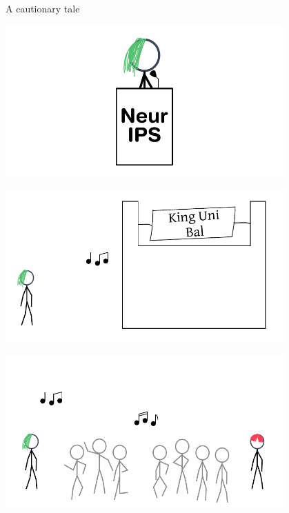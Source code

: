 \documentclass[aspectratio=169]{beamer}
\begin{document}
\begin{frame}{A cautionary tale}
     {
        \huge {}
    }
     {
        \huge {}
        \begin{center}
        \includegraphics[width=0.8\textwidth]{img/princess-comics-intro.pdf}
        \end{center}
    }
     {
        \huge {}
        \begin{center}
        \includegraphics[width=0.8\textwidth]{img/princess-comics-bal.pdf}
        \end{center}
    }
     {
        \huge {}
        \begin{center}
        \includegraphics[width=0.8\textwidth]{img/princess-comics-meeting.pdf}

\end{center}}
\end{frame}
\end{document}
